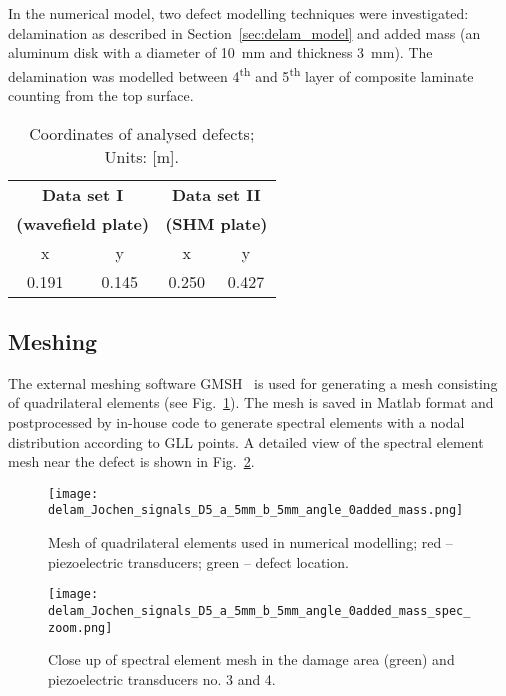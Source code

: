 \documentclass[preprint,12pt]{elsarticle}
\begin{document}
	In the numerical model, two defect modelling techniques were investigated: delamination as described in Section~\ref{sec:delam_model} and added mass (an aluminum disk with a diameter of 10~mm and thickness 3~mm). The delamination was modelled between 4\textsuperscript{th} and 5\textsuperscript{th} layer of composite laminate counting from the top surface.
	\begin{table}
		\renewcommand{\arraystretch}{1.3}
		\centering \footnotesize
		\caption{Coordinates of analysed defects; Units: [m].}
		\begin{tabular}{cccc} 
			\toprule
			\multicolumn{2}{c}{\textbf{Data set I} }	& \multicolumn{2}{c}{\textbf{Data set II} } \\
			\multicolumn{2}{c}{\textbf{(wavefield plate)} }	& \multicolumn{2}{c}{\textbf{(SHM plate)} } \\
			\cmidrule(lr){1-2} \cmidrule(lr){3-4}
			x & y &  x &  y  \\
			0.191 & 0.145 & 0.250  & 0.427 \\ 
			\bottomrule 
		\end{tabular} 
		\label{tab:defect_coordinates}
	\end{table}		
	\subsection{Meshing}
	The external meshing software GMSH~\cite{Geuzaine2009} is used for generating a mesh consisting of quadrilateral elements (see Fig.~\ref{fig:quad_mesh}). The mesh is saved in Matlab format and postprocessed by in-house code to generate spectral elements with a nodal distribution according to GLL points. A detailed view of the spectral element mesh near the defect is shown in Fig.~\ref{fig:spec_mesh_zoom}. 
	\begin{figure} [h!]
		\centering
		\texttt{[image: delam\_Jochen\_signals\_D5\_a\_5mm\_b\_5mm\_angle\_0added\_mass.png]}	
		\caption{Mesh of quadrilateral elements used in numerical modelling; red -- piezoelectric transducers; green -- defect location.}
		\label{fig:quad_mesh}
	\end{figure}
	\begin{figure} [h!]
		\centering
		\texttt{[image: delam\_Jochen\_signals\_D5\_a\_5mm\_b\_5mm\_angle\_0added\_mass\_spec\_zoom.png]}	
		\caption{Close up of spectral element mesh in the damage area (green) and piezoelectric transducers no. 3 and 4.}
		\label{fig:spec_mesh_zoom}
	\end{figure}
	\clearpage
	
\end{document}
